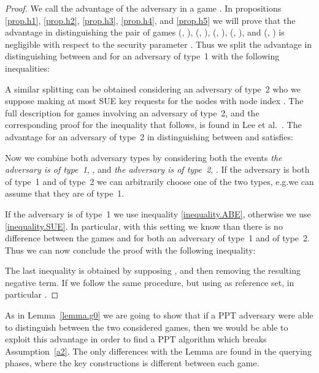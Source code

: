 \documentclass[a4paper,10pt]{article}
\newcommand{\game}[2]{}
\newcommand{\typeone}{type~1}
\newcommand{\typetwo}{type~2}
\begin{document}
\begin{proof}
\begin{table}[H]
	\end{table}
	
		We call  the advantage of the adversary  in a game \game{H}{}. In propositions \ref{prop.h1}, \ref{prop.h2}, \ref{prop.h3}, \ref{prop.h4}, and \ref{prop.h5} we will prove that the advantage in distinguishing the pair of games
(\game{H}{k,1}, \game{H}{k-1,2}),
			(\game{H}{k,1}, \game{H}{k,2}),
			(\game{H^\prime}{k,1}, \game{H^\prime}{k-1,2}),
			(\game{H^\prime}{k,1}, \game{H^\prime}{k,2}), and
			(\game{H^\prime}{0,2}, \game{H^{\prime\prime}}{})
is negligible with respect to the security parameter .
		Thus we split the advantage in distinguishing between \game{G}{1,h-1} and \game{G}{1,h} for an adversary  of \typeone{} with the following inequalities:
		
		

		A similar splitting can be obtained considering an adversary of \typetwo{} who we suppose making at most  SUE key requests for the nodes with node index .		
		The full description for games involving an adversary of \typetwo{}, and the corresponding proof for the inequality that follows, is found in Lee et al.~\cite{lee2013RSABE}.		
		The advantage for an adversary  of \typetwo{} in distinguishing between \game{G}{1,h-1} and \game{G}{1,h} satisfies:
				
		
		Now we combine both adversary types by considering both the events \textit{the adversary is of \typeone{}}, , and \textit{the adversary is of \typetwo{}}, . If the adversary is both of \typeone{} and of \typetwo{} we can arbitrarily choose one of the two types, e.g.\@ we can assume that they are of \typeone{}.
		
		If the adversary is of \typeone{} we use inequality \ref{inequality.ABE}, otherwise we use \ref{inequality.SUE}. In particular, with this setting we know than there is no difference between the games \game{G}{1,h-1} and \game{G}{1,h} for both an adversary of \typeone{} and of \typetwo{}.
		Thus we can now conclude the proof with the following inequality:
		
		
		The last inequality is obtained by supposing , and then removing the resulting negative term. If  we follow the same procedure, but using  as reference set, in particular .
	\end{proof}
	
	As in Lemma~\ref{lemma.g0} we are going to show that if a PPT adversary were able to distinguish between the two considered games, then we would be able to exploit this advantage in order to find a PPT algorithm which breaks Assumption~\ref{a2}.
	The only differences with the Lemma are found in the querying phases, where the key constructions is different between each game.
		
\end{document}
